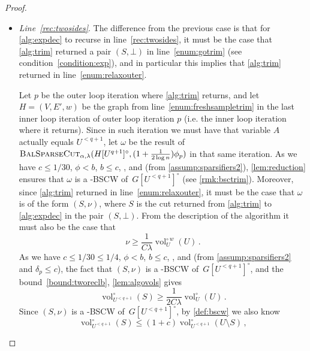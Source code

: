 \documentclass[epsfig,letter,11pt]{article}
\numberwithin{equation}{section}
\newcommand{\unvolc}[2]{\operatorname{vol}_{#2}^\circ (#1)}
\newcommand{\wvolc}[2]{\operatorname{vol}_{#2}^{\circ \,w} (#1)}
\newcommand{\bsc}{\textsc{BalSparseCut}_{\alpha,\lambda}}
\begin{document}
\begin{proof}
\begin{itemize}
		\item \emph{Line~\eqref{rec:twosides}}. The difference from the previous case is that for \cref{alg:expdec} to recurse in line~\eqref{rec:twosides}, it must be the case that \cref{alg:trim} returned a pair $(S,\bot)$ in line~\eqref{enum:gotrim} (see condition~\eqref{condition:exp}), and in particular this implies that \cref{alg:trim} returned in line~\eqref{enum:relaxouter}.
		
		Let $p$ be the outer loop iteration where \cref{alg:trim} returns, and let $H=(V,E',w)$ be the graph from line~\eqref{enum:freshsampletrim} in the last inner loop iteration of outer loop iteration $p$ (i.e. the inner loop iteration where it returns). Since in such iteration we must have that variable $A$ actually equals $U^{<q+1} $, let $\omega$ be the result of $\bsc(H[U^{q+1}]^\circ, (1+\frac{1}{2 \log n})\phi_{p})$ in that same iteration.
		As we have $ c \le 1/30$, $\phi < b$, $b \le c$, , and  (from \cref{assump:sparsifiers2}), \cref{lem:reduction} ensures that $\omega$ is a -BSCW of~$G[U^{<q+1}]^\circ$ (see \cref{rmk:bsctrim}). Moreover, since \cref{alg:trim} returned in line~\eqref{enum:relaxouter}, it must be the case that $\omega$ is of the form $(S,\nu)$, where $S$ is the cut returned from \cref{alg:trim} to \cref{alg:expdec} in the pair $(S,\bot)$. From the description of the algorithm it must also be the case that
		\begin{equation}
			\label{bound:tworeclb}
			\nu \ge \frac{1}{C\lambda} \wvolc{U}{U} \, .
		\end{equation}
		As we have $c \le 1/30 \le 1/4$, $\phi < b$, $b \le c$, , and  (from \cref{assump:sparsifiers2} and $\delta_p \le c$), the fact that $(S,\nu)$ is a -BSCW of~$G[U^{<q+1}]^\circ$, and the bound~\eqref{bound:tworeclb}, \cref{lem:algovols} gives
		\begin{equation}
			\label{bound:tworeclbactual}
			\unvolc{S}{U^{<q+1}} \ge \frac{1}{2C\lambda} \unvolc{U}{U} \, .
		\end{equation}
		Since $(S,\nu)$ is a -BSCW of~$G[U^{<q+1}]^\circ$, by \cref{def:bscw} we also know
		\begin{equation*}
			\unvolc{S}{U^{<q+1}} \le (1+c) \unvolc{U \setminus S}{U^{<q+1}} \, ,

\end{equation*}
\end{itemize}
\end{proof}
\end{document}
